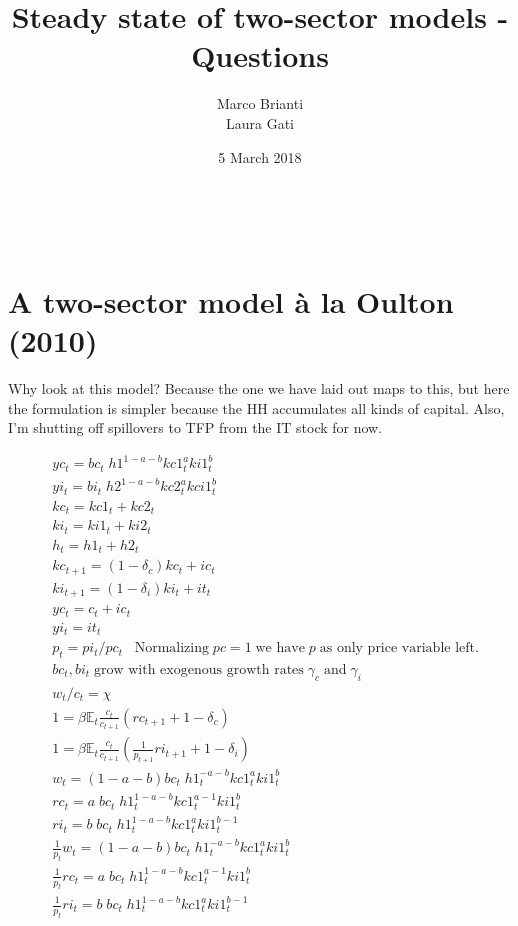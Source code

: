 \documentclass{article}
\title{Steady state of two-sector models - Questions}
\author{Marco Brianti\\Laura Gati}
\date{5 March 2018}
\begin{document}
\maketitle

\

\section{A two-sector model \`a la Oulton (2010)}
Why look at this model? Because the one we have laid out maps to this, but here the formulation is simpler because the HH accumulates all kinds of capital. Also, I'm shutting off spillovers to TFP from the IT stock for now.

\begin{align*}
& yc_t = bc_t \; h1^{1-a-b} kc1_t^aki1_t^b \\
 & yi_t = bi_t  \; h2^{1-a-b} kc2_t^a kci1_t^b \\
& kc_t  = kc1_t + kc2_t \\
& ki_t = ki1_t + ki2_t \\
& h_t  = h1_t + h2_t \\
& kc_{t+1}  = (1-\delta_c )kc_t + ic_t \\
& ki_{t+1}  = (1-\delta_i)ki_t + it_t \\
& yc_t = c_t + ic_t \\
& yi_t = it_t \\
& p_t  = pi_t / pc_t  \; \; \; \text{Normalizing} \; pc = 1 \; \text{we have} \; p \; \text{as only price variable left.}\\
& bc_t, bi_t \; \text{grow with exogenous growth rates} \; \gamma_c \; \text{and} \; \gamma_i \\
& w_t / c_t = \chi \\
& 1 = \beta \mathbb{E}_t\frac{c_t}{c_{t+1}}(rc_{t+1} + 1- \delta_c ) \\
& 1 = \beta \mathbb{E}_t\frac{c_t}{c_{t+1}} (\frac{1}{p_{t+1}}ri_{t+1} + 1-\delta_i) \\
& w_t = (1-a-b)bc_t \; h1_t^{-a-b} kc1_t^a ki1_t^b \\
& rc_t = a \; bc_t \; h1_t^{1-a-b} kc1_t^{a-1} ki1_t^b \\
& ri_t = b \; bc_t \; h1_t^{1-a-b} kc1_t^a ki1_t^{b-1} \\
& \frac{1}{p_t}w_t = (1-a-b)bc_t \; h1_t^{-a-b} kc1_t^a ki1_t^b \\
& \frac{1}{p_t}rc_t = a \; bc_t \; h1_t^{1-a-b} kc1_t^{a-1} ki1_t^b \\
& \frac{1}{p_t}ri_t = b \; bc_t \; h1_t^{1-a-b} kc1_t^a ki1_t^{b-1} 
\end{align*}
\end{document}
